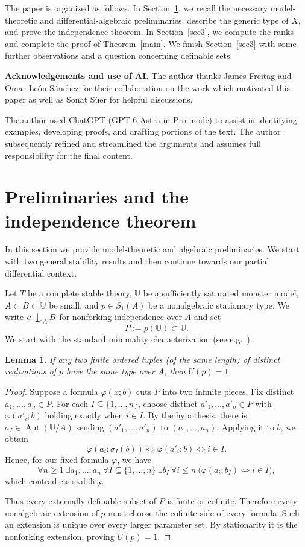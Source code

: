 \documentclass[10pt,a4paper]{amsart}
\newtheorem{lemma}[theorem]{Lemma}
\newcommand{\Uu}{{\mathds{U}}}
\def\Ind#1#2{#1\setbox0=\hbox{$#1x$}\kern\wd0\hbox to
  0pt{\hss$#1\mid$\hss} \lower.9\ht0\hbox to
  0pt{\hss$#1\smile$\hss}\kern\wd0}
\def\ind{\mathop{\mathpalette\Ind{}}}
\begin{document}
The paper is organized as follows. In Section~\ref{sec2}, we recall the
necessary model-theoretic and differential-algebraic preliminaries,
describe the generic type of $X$, and prove the independence
theorem. In Section~\ref{sec3}, we compute the ranks and complete the proof
of Theorem~\ref{main}. We finish Section~\ref{sec3} with some further observations and
a question concerning definable sets.

\medskip
\noindent
\textbf{Acknowledgements and use of AI.}
The author thanks James Freitag and Omar Le\'on S\'anchez for their
collaboration on the work which motivated this paper as well as Sonat S\"{u}er for helpful discussions.

The author used ChatGPT (GPT-6 Astra in Pro mode) to assist in identifying examples, developing proofs, and drafting portions of the text. The author subsequently refined and streamlined the arguments and assumes full responsibility for the final content.


\section{Preliminaries and the independence theorem}\label{sec2}

In this section we provide model-theoretic and algebraic preliminaries. We start with two general stability results and then continue towards our partial differential context.

Let $T$ be a complete stable theory, $\Uu$ be a
sufficiently saturated monster model, $A\subset B\subset \Uu$ be small, and $p\in S_1(A)$
be a nonalgebraic stationary type. We write $a\ind_A B$ for nonforking independence over $A$ and set 
\[
P:=p(\Uu)\subset \Uu.
\]
We start with the standard minimality characterization (see e.g.~\cite[Remark 5.6]{Pillay}).
\begin{lemma}\label{indiscernible-minimal}
If any two finite ordered tuples (of the same length)
of distinct realizations of $p$ have the same type
over $A$, then $U(p)=1$.
\end{lemma}

\begin{proof}
Suppose a formula $\varphi(x;b)$ cuts $P$ into two
infinite pieces. Fix distinct $a_1,\ldots,a_n\in P$. For each
$I\subseteq\{1,\ldots,n\}$, choose distinct $a'_1,\ldots,a'_n\in P$
with $\varphi(a'_i;b)$ holding exactly when $i\in I$. By the hypothesis, there is $\sigma_I\in \operatorname{Aut}(\Uu/A)$
 sending $(a'_1,\ldots,a'_n)$ to
$(a_1,\ldots,a_n)$. Applying it to $b$, we obtain
\[
\varphi(a_i;\sigma_I(b))
\iff \varphi(a'_i;b)
\iff i\in I.
\]
Hence, for our fixed formula $\varphi$, we have
\[
\forall n\geqslant1\ \exists a_1,\ldots,a_n\
\forall I\subseteq\{1,\ldots,n\}\ \exists b_I\
\forall i\leqslant n\
\bigl(\varphi(a_i;b_I)\iff i\in I\bigr),
\]
which contradicts stability.

Thus every externally definable subset of $P$ is finite or cofinite.
Therefore
every nonalgebraic extension of $p$ must choose the cofinite side of
every formula. Such an extension is unique over every larger parameter
set. By stationarity it is the nonforking extension, proving $U(p)=1$.
\end{proof}
\end{document}
